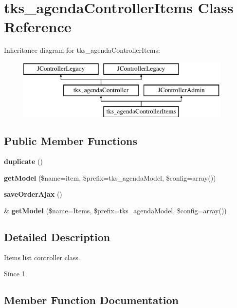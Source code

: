 \section{tks\+\_\+agenda\+Controller\+Items Class Reference}
\label{classtks__agenda_controller_items}
Inheritance diagram for tks\+\_\+agenda\+Controller\+Items\+:\begin{figure}[H]
\begin{center}
\leavevmode
\includegraphics[height=3.000000cm]{classtks__agenda_controller_items}
\end{center}
\end{figure}
\subsection*{Public Member Functions}
\begin{DoxyCompactItemize}
\item 
\textbf{ duplicate} ()
\item 
\textbf{ get\+Model} (\$name=\textquotesingle{}item\textquotesingle{}, \$prefix=\textquotesingle{}tks\+\_\+agenda\+Model\textquotesingle{}, \$config=array())
\item 
\textbf{ save\+Order\+Ajax} ()
\item 
\& \textbf{ get\+Model} (\$name=\textquotesingle{}Items\textquotesingle{}, \$prefix=\textquotesingle{}tks\+\_\+agenda\+Model\textquotesingle{}, \$config=array())
\end{DoxyCompactItemize}


\subsection{Detailed Description}
Items list controller class.

\begin{DoxySince}{Since}
1. 
\end{DoxySince}


\subsection{Member Function Documentation}
\mbox{\label{classtks__agenda_controller_items_a982be2ab3c656d4d6aec2c29e3eba956}} 
